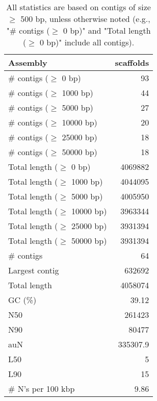\documentclass[12pt,a4paper]{article}
\begin{document}
\begin{table}[ht]
\begin{center}
\caption{All statistics are based on contigs of size $\geq$ 500 bp, unless otherwise noted (e.g., "\# contigs ($\geq$ 0 bp)" and "Total length ($\geq$ 0 bp)" include all contigs).}
\begin{tabular}{|l*{1}{|r}|}
\hline
Assembly & scaffolds \\ \hline
\# contigs ($\geq$ 0 bp) & 93 \\ \hline
\# contigs ($\geq$ 1000 bp) & 44 \\ \hline
\# contigs ($\geq$ 5000 bp) & 27 \\ \hline
\# contigs ($\geq$ 10000 bp) & 20 \\ \hline
\# contigs ($\geq$ 25000 bp) & 18 \\ \hline
\# contigs ($\geq$ 50000 bp) & 18 \\ \hline
Total length ($\geq$ 0 bp) & 4069882 \\ \hline
Total length ($\geq$ 1000 bp) & 4044095 \\ \hline
Total length ($\geq$ 5000 bp) & 4005950 \\ \hline
Total length ($\geq$ 10000 bp) & 3963344 \\ \hline
Total length ($\geq$ 25000 bp) & 3931394 \\ \hline
Total length ($\geq$ 50000 bp) & 3931394 \\ \hline
\# contigs & 64 \\ \hline
Largest contig & 632692 \\ \hline
Total length & 4058074 \\ \hline
GC (\%) & 39.12 \\ \hline
N50 & 261423 \\ \hline
N90 & 80477 \\ \hline
auN & 335307.9 \\ \hline
L50 & 5 \\ \hline
L90 & 15 \\ \hline
\# N's per 100 kbp & 9.86 \\ \hline
\end{tabular}
\end{center}
\end{table}
\end{document}
